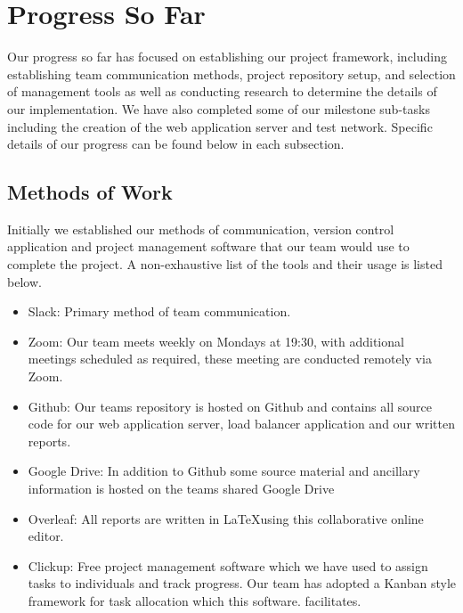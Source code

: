 \section{Progress So Far} \label{sec:progress}

Our progress so far has focused on establishing our project framework, including establishing team communication methods, project repository setup, and selection of management tools as well as conducting research to determine the details of our implementation. We have also completed some of our milestone sub-tasks including the creation of the web application server and test network. Specific details of our progress can be found below in each subsection. 

\subsection{Methods of Work}
Initially we established our methods of communication, version control application and project management software that our team would use to complete the project. A non-exhaustive list of the tools and their usage is listed below.
\begin{itemize}
    \item Slack\cite{slack}: Primary method of team communication.
    \item Zoom\cite{zoom}: Our team meets weekly on Mondays at 19:30, with additional meetings scheduled as required, these meeting are conducted remotely via Zoom.
    \item Github\cite{github}: Our teams repository is hosted on Github and contains all source code for our web application server, load balancer application and our written reports.
    \item Google Drive\cite{googDrive}: In addition to Github some source material and ancillary information is hosted on the teams shared Google Drive
    \item Overleaf\cite{overleaf}: All reports are written in \LaTeX using this collaborative online editor.
    \item Clickup\cite{clickup}: Free project management software which we have used to assign tasks to individuals and track progress. Our team has adopted a Kanban style framework for task allocation which this software. facilitates. 
\end{itemize}


